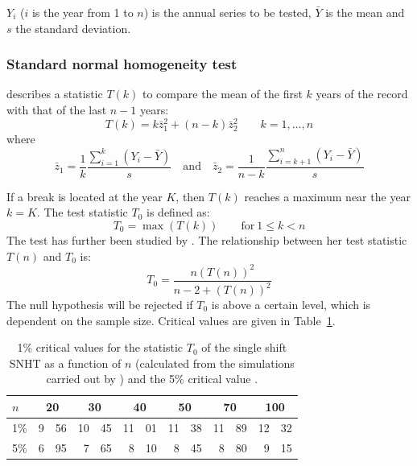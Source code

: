 \documentclass[a4paper,11pt]{article}
\begin{document}
$Y_i$ ($i$ is the year from 1 to $n$) is the annual series to be
tested, $\bar{Y}$ is the mean and $s$ the standard deviation.

\subsubsection{Standard normal homogeneity test}
\label{sec:snh}

\citet{alexandersson} describes a statistic $T(k)$ to compare the mean
of the first $k$ years of the record with that of the last $n-1$
years:
\begin{equation*}
T(k) = k \bar{z}_1^2 + (n-k) \bar{z}_2^2 \qquad k=1,\ldots,n
\end{equation*}
where
\begin{equation*}
\bar{z}_1 =
\frac{1}{k}\frac{\sum_{i=1}^{k}(Y_i-\bar{Y})}{s} \quad
\mathrm{and} \quad
\bar{z}_2 = \frac{1}{n-k}\frac{\sum_{i=k+1}^{n}(Y_i - \bar{Y})}{s}
\end{equation*}

If a break is located at the year $K$, then $T(k)$ reaches a maximum
near the year $k=K$. The test statistic $T_0$ is defined as:
\begin{equation*}
T_0 = \max \left(T(k)\right) \qquad \mathrm{for}\: 1 \leq k < n
\end{equation*}
The test has further been studied by \citet{jaruskova}. The
relationship between her test statistic $T(n)$ and $T_0$ is:
\begin{equation*}
T_0 = \frac{n(T(n))^2}{n - 2 + (T(n))^2}
\end{equation*}
The null hypothesis will be rejected if $T_0$ is above a certain
level, which is dependent on the sample size. Critical values are
given in Table~\ref{tab:snh}.

\begin{table}[!ht]
\begin{center}
\caption{1\% critical values for the statistic $T_0$ of the single
shift SNHT as a function of $n$ (calculated from the simulations
carried out by \citet{jaruskova}) and the 5\% critical value
\citep{alexandersson}.}
\label{tab:snh}
\begin{tabular}{l r@{.}l r@{.}l r@{.}l r@{.}l r@{.}l r@{.}l}
\hline
$n$ & \multicolumn{2}{c}{20} & \multicolumn{2}{c}{30} & \multicolumn{2}{c}{40} & \multicolumn{2}{c}{50} & \multicolumn{2}{c}{70} & \multicolumn{2}{c}{100}\\
\hline
1\% & 9&56 & 10&45 & 11&01 & 11&38 & 11&89 & 12&32\\
5\% & 6&95 & 7&65 & 8&10 & 8&45 & 8&80 & 9&15 \\
\hline
\end{tabular}
\end{center}
\end{table}
\end{document}
